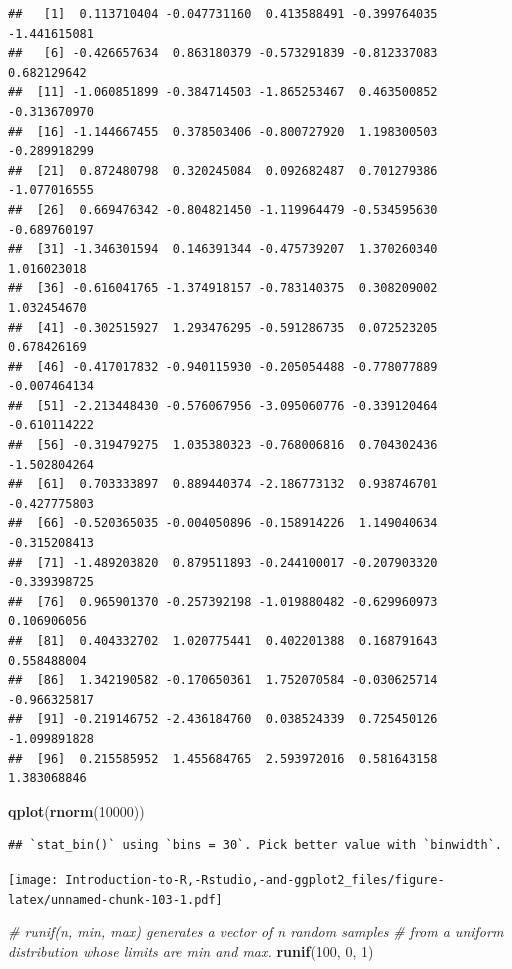 \documentclass[]{book}
\newenvironment{Shaded}{\begin{snugshade}}{\end{snugshade}}
\newcommand{\CommentTok}[1]{\textcolor[rgb]{0.56,0.35,0.01}{\textit{#1}}}
\newcommand{\DecValTok}[1]{\textcolor[rgb]{0.00,0.00,0.81}{#1}}
\newcommand{\KeywordTok}[1]{\textcolor[rgb]{0.13,0.29,0.53}{\textbf{#1}}}
\newcommand{\NormalTok}[1]{#1}
\begin{document}
\begin{verbatim}
##   [1]  0.113710404 -0.047731160  0.413588491 -0.399764035 -1.441615081
##   [6] -0.426657634  0.863180379 -0.573291839 -0.812337083  0.682129642
##  [11] -1.060851899 -0.384714503 -1.865253467  0.463500852 -0.313670970
##  [16] -1.144667455  0.378503406 -0.800727920  1.198300503 -0.289918299
##  [21]  0.872480798  0.320245084  0.092682487  0.701279386 -1.077016555
##  [26]  0.669476342 -0.804821450 -1.119964479 -0.534595630 -0.689760197
##  [31] -1.346301594  0.146391344 -0.475739207  1.370260340  1.016023018
##  [36] -0.616041765 -1.374918157 -0.783140375  0.308209002  1.032454670
##  [41] -0.302515927  1.293476295 -0.591286735  0.072523205  0.678426169
##  [46] -0.417017832 -0.940115930 -0.205054488 -0.778077889 -0.007464134
##  [51] -2.213448430 -0.576067956 -3.095060776 -0.339120464 -0.610114222
##  [56] -0.319479275  1.035380323 -0.768006816  0.704302436 -1.502804264
##  [61]  0.703333897  0.889440374 -2.186773132  0.938746701 -0.427775803
##  [66] -0.520365035 -0.004050896 -0.158914226  1.149040634 -0.315208413
##  [71] -1.489203820  0.879511893 -0.244100017 -0.207903320 -0.339398725
##  [76]  0.965901370 -0.257392198 -1.019880482 -0.629960973  0.106906056
##  [81]  0.404332702  1.020775441  0.402201388  0.168791643  0.558488004
##  [86]  1.342190582 -0.170650361  1.752070584 -0.030625714 -0.966325817
##  [91] -0.219146752 -2.436184760  0.038524339  0.725450126 -1.099891828
##  [96]  0.215585952  1.455684765  2.593972016  0.581643158  1.383068846
\end{verbatim}

\begin{Shaded}
\begin{Highlighting}[]
\KeywordTok{qplot}\NormalTok{(}\KeywordTok{rnorm}\NormalTok{(}\DecValTok{10000}\NormalTok{))}
\end{Highlighting}
\end{Shaded}

\begin{verbatim}
## `stat_bin()` using `bins = 30`. Pick better value with `binwidth`.
\end{verbatim}

\texttt{[image: Introduction-to-R,-Rstudio,-and-ggplot2\_files/figure-latex/unnamed-chunk-103-1.pdf]}

\begin{Shaded}
\begin{Highlighting}[]
\CommentTok{# runif(n, min, max) generates a vector of n random samples }
\CommentTok{# from a uniform distribution whose limits are min and max. }
\KeywordTok{runif}\NormalTok{(}\DecValTok{100}\NormalTok{, }\DecValTok{0}\NormalTok{, }\DecValTok{1}\NormalTok{)}
\end{Highlighting}
\end{Shaded}
\end{document}
